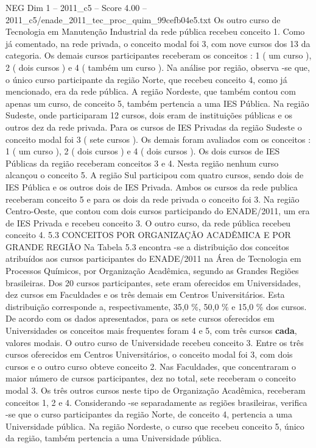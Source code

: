 \begin{textsample}{NEG Dim 1 – 2011\_c5 – Score 4.00 – 2011\_c5/enade\_2011\_tec\_proc\_quim\_99cefb04e5.txt}
Os outro curso de Tecnologia em Manutenção Industrial da rede pública recebeu conceito 1.
Como já comentado, na rede privada, o conceito modal foi 3, com nove cursos dos 13 da categoria.
Os demais cursos participantes receberam os conceitos : 1 ( um curso ), 2 ( dois cursos ) e 4 ( também um curso ).
Na análise por região, observa -se que, o único curso participante da região Norte, que recebeu conceito 4, como já mencionado, era da rede pública.
A região Nordeste, que também contou com apenas um curso, de conceito 5, também pertencia a uma IES Pública.
Na região Sudeste, onde participaram 12 cursos, dois eram de instituições públicas e os outros dez da rede privada.
Para os cursos de IES Privadas da região Sudeste o conceito modal foi 3 ( sete cursos ).
Os demais foram avaliados com os conceitos : 1 ( um curso ), 2 ( dois cursos ) e 4 ( dois cursos ).
Os dois cursos de IES Públicas da região receberam conceitos 3 e 4.
Nesta região nenhum curso alcançou o conceito 5.
A região Sul participou com quatro cursos, sendo dois de IES Pública e os outros dois de IES Privada.
Ambos os cursos da rede publica receberam conceito 5 e para os dois da rede privada o conceito foi 3.
Na região Centro-Oeste, que contou com dois cursos participando do ENADE/2011, um era de IES Privada e recebeu conceito 3.
O outro curso, da rede pública recebeu conceito 4. 5.3 CONCEITOS POR ORGANIZAÇÃO ACADÊMICA E POR GRANDE REGIÃO Na Tabela 5.3 encontra -se a distribuição dos conceitos atribuídos aos cursos participantes do ENADE/2011 na Área de Tecnologia em Processos Químicos, por Organização Acadêmica, segundo as Grandes Regiões brasileiras.
Dos 20 cursos participantes, sete eram oferecidos em Universidades, dez cursos em Faculdades e os três demais em Centros Universitários.
Esta distribuição corresponde a, respectivamente, 35,0 \%, 50,0 \% e 15,0 \% dos cursos.
De acordo com os dados apresentados, para os sete cursos oferecidos em Universidades os conceitos mais frequentes foram 4 e 5, com três cursos \textbf{cada}, valores modais.
O outro curso de Universidade recebeu conceito 3.
Entre os três cursos oferecidos em Centros Universitários, o conceito modal foi 3, com dois cursos e o outro curso obteve conceito 2.
Nas Faculdades, que concentraram o maior número de cursos participantes, dez no total, sete receberam o conceito modal 3.
Os três outros cursos neste tipo de Organização Acadêmica, receberam conceitos 1, 2 e 4.
Considerando -se separadamente as regiões brasileiras, verifica -se que o curso participantes da região Norte, de conceito 4, pertencia a uma Universidade pública.
Na região Nordeste, o curso que recebeu conceito 5, único da região, também pertencia a uma Universidade pública.

\end{textsample}
